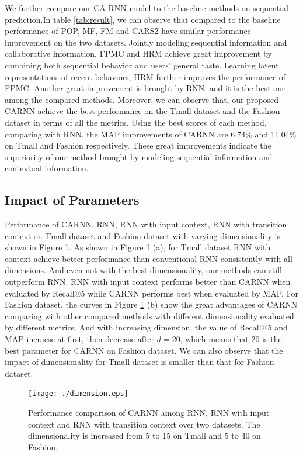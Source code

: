 \documentclass[conference]{IEEEtran}
\begin{document}
We further compare our CA-RNN model to the baseline methods on sequential prediction.In table \ref{tab:result}, we can observe that compared to the baseline performance of POP, MF, FM and CARS2 have similar performance improvement on the two datasets. Jointly modeling sequential information and collaborative information, FPMC and HRM achieve great improvement by combining both sequential behavior and users’ general taste. Learning latent representations of recent behaviors, HRM further improves the performance of FPMC. Another great improvement is brought by RNN, and it is the best one among the compared methods. Moreover, we can observe that, our proposed CARNN achieve the best performance on the Tmall dataset and the Fashion dataset in terms of all the metrics. Using the best scores of each method, comparing with RNN, the MAP improvements of CARNN are 6.74\% and 11.04\% on Tmall and Fashion respectively. These great improvements indicate the superiority of our method brought by modeling sequential information and contextual information.





\subsection{Impact of Parameters}

Performance of CARNN, RNN, RNN with input context, RNN with transition context on Tmall dataset and Fashion dataset with varying dimensionality is shown in Figure \ref{fig:dimension}. As shown in Figure \ref{fig:dimension} (a), for Tmall dataset RNN with context achieve better performance than conventional RNN consistently with all dimensions. And even not with the best dimensionality, our methods can still outperform RNN. RNN with input context performs better than CARNN when evaluated by Recall@5 while CARNN performs best when evaluated by MAP. For Fashion dataset, the curves in Figure \ref{fig:dimension} (b) show the great advantages of CARNN comparing with other compared methods with different dimensionality evaluated by different metrics. And with increasing dimension, the value of Recall@5 and MAP incraese at first, then decrease after $d = 20$, which means that 20 is the best parameter for CARNN on Fashion dataset. We can also observe that the impact of dimensionality for Tmall dataset is smaller than that for Fashion dataset.


\begin{figure}[!tb]
\centering
{
\begin{minipage}[b]{0.5\textwidth}
\texttt{[image: ./dimension.eps]}
\label{dimension}
\end{minipage}
}

\caption{Performance comparison of CARNN among RNN, RNN with input context and RNN with transition context over two datasets. The dimensionality is increased from 5 to 15 on Tmall and 5 to 40 on Fashion.}
\label{fig:dimension}
\end{figure}
\end{document}
